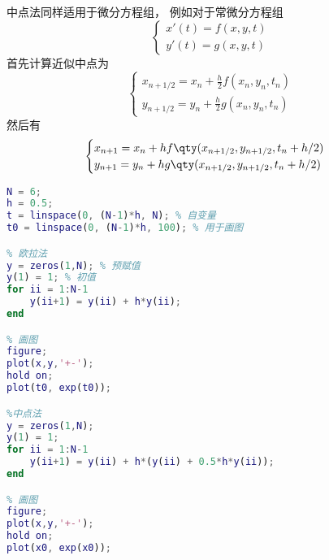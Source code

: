 中点法同样适用于微分方程组， 例如对于常微分方程组
\begin{equation}
\begin{cases}
x'(t) = f(x, y, t)\\
y'(t) = g(x, y, t)
\end{cases}
\end{equation}
首先计算近似中点为
\begin{equation}
\begin{cases}
x_{n+1/2} = x_n + \frac{h}{2} f(x_n, y_n, t_n)\\
y_{n+1/2} = y_n + \frac{h}{2} g(x_n, y_n, t_n)
\end{cases}
\end{equation}
然后有
\begin{equation}\label{eq_OdeMid_7}
\begin{cases}
x_{n+1} = x_n + h f \qty(x_{n+1/2}, y_{n+1/2}, t_n + h/2)\\
y_{n+1} = y_n + h g \qty(x_{n+1/2}, y_{n+1/2}, t_n + h/2)
\end{cases}
\end{equation}

\begin{lstlisting}[language=matlab, caption=odeMid.m]
% 设置参数
N = 6;
h = 0.5;
t = linspace(0, (N-1)*h, N); % 自变量
t0 = linspace(0, (N-1)*h, 100); % 用于画图

% 欧拉法
y = zeros(1,N); % 预赋值
y(1) = 1; % 初值
for ii = 1:N-1
    y(ii+1) = y(ii) + h*y(ii);
end

% 画图
figure;
plot(x,y,'+-');
hold on;
plot(t0, exp(t0));

%中点法
y = zeros(1,N);
y(1) = 1;
for ii = 1:N-1
    y(ii+1) = y(ii) + h*(y(ii) + 0.5*h*y(ii));
end

% 画图
figure;
plot(x,y,'+-');
hold on;
plot(x0, exp(x0));
\end{lstlisting}
